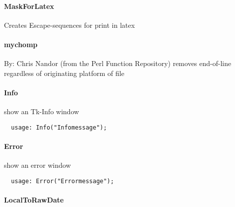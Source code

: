 \paragraph*{MaskForLatex\label{Apiis::Misc_--_Provides_some_usefull_subroutines_mainly_for_compatibility_reasons_MaskForLatex}}


Creates Escape-sequences for print in latex

\paragraph*{mychomp\label{Apiis::Misc_--_Provides_some_usefull_subroutines_mainly_for_compatibility_reasons_mychomp}}


By: Chris Nandor (from the Perl Function Repository)
removes end-of-line regardless of originating platform
of file

\paragraph*{Info\label{Apiis::Misc_--_Provides_some_usefull_subroutines_mainly_for_compatibility_reasons_Info}}


show an Tk-Info window

\begin{verbatim}
  usage: Info("Infomessage");
\end{verbatim}
\paragraph*{Error\label{Apiis::Misc_--_Provides_some_usefull_subroutines_mainly_for_compatibility_reasons_Error}}


show an error window

\begin{verbatim}
  usage: Error("Errormessage");
\end{verbatim}
\paragraph*{LocalToRawDate\label{Apiis::Misc_--_Provides_some_usefull_subroutines_mainly_for_compatibility_reasons_LocalToRawDate}}


